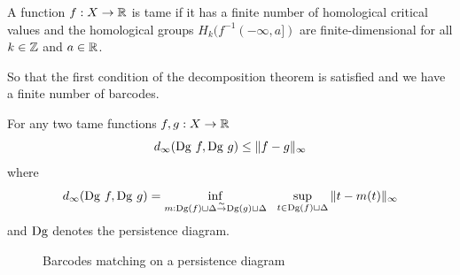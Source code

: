 \begin{definition}[Tame]
  A function $f : X \to \mathbb{R}$ is tame if it has a finite number of homological
  critical values and the homological groups $H_k(f^{-1}(-\infty, a])$ are finite-dimensional
  for all $k\in\mathbb{Z}$ and $a\in\mathbb{R}$.
\end{definition}
\RM So that the first condition of the decomposition theorem is satisfied
and we have a finite number of barcodes.

\begin{theorem}
  For any two tame functions $f, g : X \to \mathbb{R}$
  $$
  d_\infty(\mathrm{Dg}~f, \mathrm{Dg}~g) \le \|f-g\|_\infty
  $$
  where
  $$
  d_\infty(\mathrm{Dg}~f, \mathrm{Dg}~g) =
  \inf_{m : \mathrm{Dg}(f)\sqcup \Delta \stackrel{\sim}{\to} \mathrm{Dg}(g)\sqcup \Delta}
  ~~
  \sup_{t\in \mathrm{Dg}(f)\sqcup \Delta} \|t-m(t)\|_\infty
  $$
  and $\mathrm{Dg}$ denotes the persistence diagram.
\end{theorem}

\begin{figure}
\centering
{}
\caption{Barcodes matching on a persistence diagram}
\label{fig:persistence diagram domaine}
\end{figure}

